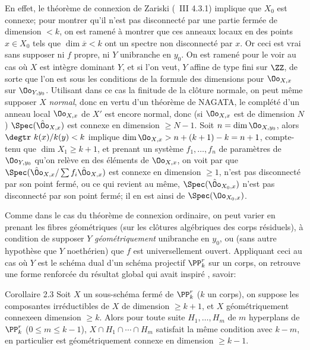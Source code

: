 En effet, le th\'eor\`eme de connexion de Zariski (\cf\ \EGA III 4.3.1) implique que $X_0$ est connexe; pour montrer qu'il n'est pas disconnect\'e par une partie ferm\'ee de dimension $<k$, on est ramen\'e \`a montrer que ces anneaux locaux en des points $x\in X_0$ tels que $\dim \overline{x}<k$ ont un spectre non disconnect\'e par $x$. Or ceci est vrai sans supposer ni $f$ propre, ni $Y$ unibranche en $y_0$. On est ramen\'e pour le voir au cas o\`u $X$ est int\`egre dominant $Y$, et si l'on veut, $Y$ affine de type fini sur $\ZZ$, de sorte que l'on est sous les conditions de la formule des dimensions pour $\Oo_{X, x}$ sur $\Oo_{Y, y_0}$. Utilisant dans ce cas la finitude de la cl\^{o}ture normale, on peut m\^eme supposer $X$ \emph{normal}, donc en vertu d'un th\'eor\`eme de NAGATA, le compl\'et\'e d'un anneau local $\Oo_{X, x}$ de $X'$ est encore normal, donc (si $\Oo_{X, x}$ est de dimension $N$) $\Spec (\hat{\Oo}_{X, x})$ est connexe en dimension $\ge N-1$. Soit $n=\dim\Oo_{X, y_0}$, alors $\degtr~k(x)/k(y)<k$ implique $\dim \Oo_{X, x}>n+(k+1)-k=n+1$, compte-tenu que  $\dim X_1\ge k+1$, et prenant un syst\`eme $f_1, \dotsc, f_n$ de param\`etres de $\Oo_{Y, y_0}$ qu'on rel\`eve en des \'el\'ements de $\Oo_{X, x}$, on voit par  que $\Spec (\hat{\Oo}_{X, x}/\sum f_i\hat{\Oo}_{X, x})$ est connexe en dimension $\ge 1$, \ie n'est pas disconnect\'e par son point ferm\'e, ou ce qui revient au m\^eme, $\Spec(\hat{\Oo}_{X_0, x})$ n'est pas disconnect\'e par son point ferm\'e; \afortiori il en est ainsi de $\Spec (\Oo_{X_0, x})$.

Comme dans le cas du th\'eor\`eme de connexion ordinaire, on peut varier  en prenant les fibres g\'eom\'etriques (sur les cl\^{o}tures alg\'ebriques des corps r\'esiduels), \`a condition de supposer $Y$ \emph{g\'eom\'etriquement} unibranche en $y_0$, ou (sans autre hypoth\`ese que $Y$ noeth\'erien) que $f$ est universellement ouvert. Appliquant ceci au cas o\`u $Y$ est le sch\'ema dual d'un sch\'ema projectif $\PP_k^r$ sur un corps, on retrouve une forme renforc\'ee du r\'esultat global qui avait inspir\'e , savoir:

\label{XIII.2.3}
\begin{enonce*}{Corollaire 2.3\ndemark}
Soit $X$ un sous-sch\'ema ferm\'e de $\PP^r_k$ ($k$ un corps), on suppose les composantes irr\'eductibles de $X$ de dimension $\ge k+1$, et $X$ g\'eom\'etriquement connexe\pageoriginaled en dimension $\ge k$. Alors pour toute suite $H_1, \dotsc, H_m$ de $m$ hyperplans de $\PP^r_k$ ($0\le m\le k-1$), $X\cap H_1\cap \dotsb \cap H_m$ satisfait la m\^eme condition avec $k-m$, en particulier est g\'eom\'etriquement connexe en dimension $\ge k-1$.
\end{enonce*}

